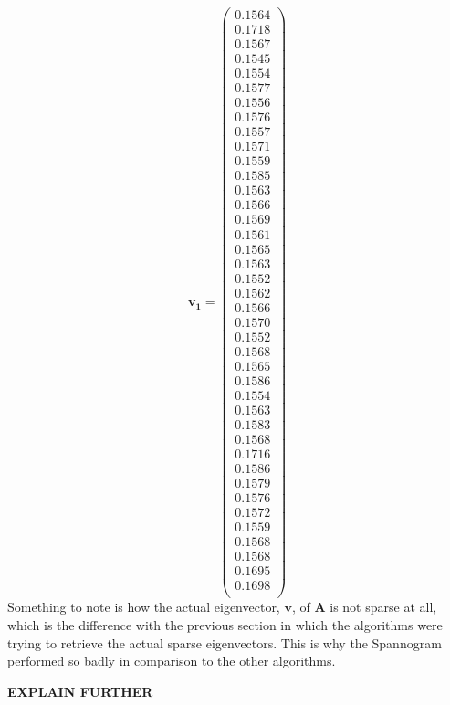 \documentclass[11pt,a4paper]{article}
\newcommand{\covmat}{\mathbf{A}}
\begin{document}
\begin{equation*}
\mathbf{\mathbf{v}_1}=
\begin{pmatrix}
0.1564\\
0.1718\\
0.1567\\
0.1545\\
0.1554\\
0.1577\\
0.1556\\
0.1576\\
0.1557\\
0.1571\\
0.1559\\
0.1585\\
0.1563\\
0.1566\\
0.1569\\
0.1561\\
0.1565\\
0.1563\\
0.1552\\
0.1562\\
0.1566\\
0.1570\\
0.1552\\
0.1568\\
0.1565\\
0.1586\\
0.1554\\
0.1563\\
0.1583\\
0.1568\\
0.1716\\
0.1586\\
0.1579\\
0.1576\\
0.1572\\
0.1559\\
0.1568\\
0.1568\\
0.1695\\
0.1698\\
\end{pmatrix}
\end{equation*}
Something to note is how the actual eigenvector, $\mathbf{v}$, of $\covmat$ is not sparse at all, which is the difference with the previous section in which the algorithms were trying to retrieve the actual sparse eigenvectors. This is why the Spannogram performed so badly in comparison to the other algorithms. 

\textbf{EXPLAIN FURTHER}
\end{document}
